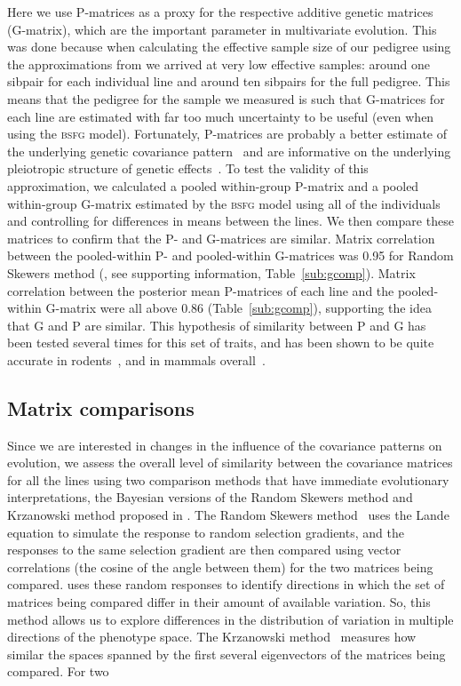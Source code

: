 \begin{refsection}
Here we use P-matrices as a proxy for the respective additive genetic
matrices (G-matrix), which are the important parameter in multivariate
evolution. This was done because when calculating the effective sample
size of our pedigree using the approximations from \textcite{Raffa2016-uh} we arrived
at very low effective samples: around one sibpair for each individual
line and around ten sibpairs for the full pedigree. This means that the
pedigree for the sample we measured is such that G-matrices for each
line are estimated with far too much uncertainty to be useful (even when
using the \textsc{bsfg} model). Fortunately, P-matrices are probably a better
estimate of the underlying genetic covariance
pattern~\parencite{Roff1995-ws, Marroig2012-jd} and are informative on the
underlying pleiotropic structure of genetic
effects~\parencite{Kenney-Hunt2008-bd, Porto2016-qc}. To test the validity of this
approximation, we calculated a pooled within-group P-matrix and a pooled
within-group G-matrix estimated by the \textsc{bsfg} model using all of the
individuals and controlling for differences in means between the lines.
We then compare these matrices to confirm that the P- and G-matrices are
similar. Matrix correlation between the pooled-within P- and
pooled-within G-matrices was 0.95 for Random Skewers method
(\textcite{Cheverud2007-yp}, see supporting information, Table~\ref{sub:gcomp}). Matrix
correlation between the posterior mean P-matrices of each line and the
pooled-within G-matrix were all above 0.86 (Table~\ref{sub:gcomp}), supporting the
idea that G and P are similar. This hypothesis of similarity between P
and G has been tested several times for this set of traits, and has been
shown to be quite accurate in rodents~\parencite{Garcia2014-oj}, and in mammals
overall~\parencite{Cheverud1988-he, Porto2009-pi, Porto2016-qc, Marroig2010-be, Hubbe2016-za, Porto2015-zv}.

\subsection{Matrix comparisons}

Since we are interested in changes in the influence of the covariance
patterns on evolution, we assess the overall level of similarity between
the covariance matrices for all the lines using two comparison methods
that have immediate evolutionary interpretations, the Bayesian versions
of the Random Skewers method and Krzanowski method proposed in
\textcite{Aguirre2013-lp}. The Random Skewers method~\parencite{Cheverud2007-yp} uses the
Lande equation to simulate the response to random selection gradients,
and the responses to the same selection gradient are then compared using
vector correlations (the cosine of the angle between them) for the two
matrices being compared. \textcite{Aguirre2013-lp} uses these random responses to
identify directions in which the set of matrices being compared differ
in their amount of available variation. So, this method allows us to
explore differences in the distribution of variation in multiple
directions of the phenotype space. The Krzanowski
method~\parencite{Krzanowski1979-gj} measures how similar the spaces spanned by
the first several eigenvectors of the matrices being compared. For two


\end{refsection}

